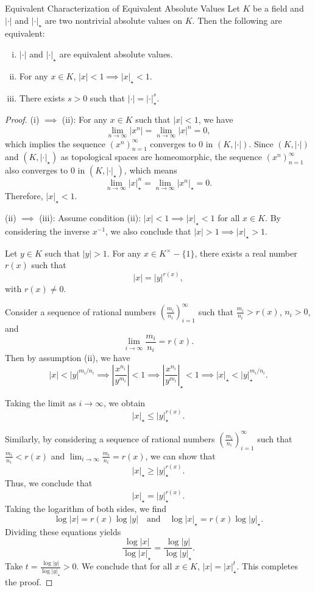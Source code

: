 \begin{proposition}{Equivalent Characterization of Equivalent Absolute Values}{}
    Let $K$ be a field and $|\cdot|$ and $ |\cdot|_\star $ are two nontrivial absolute values on $K$. Then the following are equivalent:
\begin{enumerate}[(i)]
    \item $|\cdot|$ and $ |\cdot|_\star $ are equivalent absolute values.
    \item For any $x\in K$, $|x| < 1 \implies |x|_\star < 1$.
    \item There exists $s > 0$ such that $|\cdot| = |\cdot|_\star^s$.
\end{enumerate}
    
\end{proposition}
\begin{proof}
    (i) $\implies$ (ii): For any $x\in K$ such that $|x|<1$, we have 
    \[  
    \lim_{n\to \infty} |x^n| =\lim_{n\to \infty} |x|^n= 0 ,
    \]
    which implies the sequence $\left(x^n\right)_{n=1}^\infty$ converges to 0 in $(K, |\cdot|)$. Since $(K, |\cdot|)$ and $(K, |\cdot|_\star)$ as topological spaces are homeomorphic, the sequence $\left(x^n\right)_{n=1}^\infty$ also converges to 0 in $(K, |\cdot|_\star)$, which means 
    \[
        \lim_{n\to \infty} |x|_\star^n=\lim_{n\to \infty} |x^n|_\star = 0.
\]
    Therefore, $|x|_\star<1$.

    (ii) $\implies$ (iii): Assume condition (ii): $|x| < 1 \implies |x|_\star < 1$ for all $x \in K$. By considering the inverse $x^{-1}$, we also conclude that $|x| > 1 \implies |x|_\star > 1$.

    Let $y \in K$ such that $|y| > 1$. For any $x \in K^\times-\{1\}$, there exists a real number $r(x)$ such that
    \[
    |x| = |y|^{r(x)},
    \]
    with $r(x) \neq 0$.
    
    Consider a sequence of rational numbers $\left(\frac{m_i}{n_i}\right)_{i=1}^\infty$ such that $\frac{m_i}{n_i} > r(x)$, $n_i > 0$, and
    \[
    \lim_{i \to \infty} \frac{m_i}{n_i} = r(x).
    \]
    Then by assumption (ii), we have
    \[
    |x| < |y|^{m_i / n_i}\implies
    \left| \frac{x^{n_i}}{y^{m_i}} \right| < 1\implies \left| \frac{x^{n_i}}{y^{m_i}} \right|_\star < 1\implies
    |x|_\star < |y|_\star^{m_i / n_i}.
    \]
    
   
    Taking the limit as $i \to \infty$, we obtain
    \[
    |x|_\star \leq |y|_\star^{r(x)}.
    \]
    
    Similarly, by considering a sequence of rational numbers $\left(\frac{m_i}{n_i}\right)_{i=1}^\infty$ such that $\frac{m_i}{n_i} < r(x)$ and $\lim_{i \to \infty} \frac{m_i}{n_i} = r(x)$, we can show that
    \[
    |x|_\star \geq |y|_\star^{r(x)}.
    \]
    Thus, we conclude that
    \[
    |x|_\star = |y|_\star^{r(x)}.
    \]
    Taking the logarithm of both sides, we find
    \[
    \log |x| = r(x) \log |y| \quad \text{and} \quad \log |x|_\star = r(x) \log |y|_\star.
    \]
    Dividing these equations yields
    \[
    \frac{\log |x|}{\log |x|_\star} = \frac{\log |y|}{\log |y|_\star}.
    \]
    Take $t=\frac{\log |y|}{\log |y|_\star} > 0$. We conclude that for all $x \in K$, $|x| = |x|_\star^t$. This completes the proof.


\end{proof}
